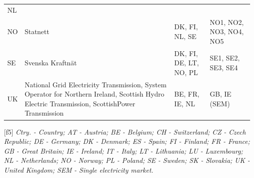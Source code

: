 \begin{longtable}[]{@{}llll@{}}
\begin{minipage}[t]{0.22\columnwidth}
NL\strut
\end{minipage}\tabularnewline
\begin{minipage}[t]{0.07\columnwidth}\raggedright
NO\strut
\end{minipage} & \begin{minipage}[t]{0.36\columnwidth}\raggedright
Statnett\strut
\end{minipage} & \begin{minipage}[t]{0.22\columnwidth}\raggedright
DK, FI, NL, SE\strut
\end{minipage} & \begin{minipage}[t]{0.22\columnwidth}\raggedright
NO1, NO2, NO3, NO4, NO5\strut
\end{minipage}\tabularnewline
\begin{minipage}[t]{0.07\columnwidth}\raggedright
SE\strut
\end{minipage} & \begin{minipage}[t]{0.36\columnwidth}\raggedright
Svenska Kraftnät\strut
\end{minipage} & \begin{minipage}[t]{0.22\columnwidth}\raggedright
DK, FI, DE, LT, NO, PL\strut
\end{minipage} & \begin{minipage}[t]{0.22\columnwidth}\raggedright
SE1, SE2, SE3, SE4\strut
\end{minipage}\tabularnewline
\begin{minipage}[t]{0.07\columnwidth}\raggedright
UK\strut
\end{minipage} & \begin{minipage}[t]{0.36\columnwidth}\raggedright
National Grid Electricity Transmission, System Operator for Northern
Ireland, Scottish Hydro Electric Transmission, ScottishPower
Transmission\strut
\end{minipage} & \begin{minipage}[t]{0.22\columnwidth}\raggedright
BE, FR, IE, NL\strut
\end{minipage} & \begin{minipage}[t]{0.22\columnwidth}\raggedright
GB, IE (SEM)\strut
\end{minipage}\tabularnewline
\bottomrule
\end{longtable}

\protect\hypertarget{f5}{}{{[}f5{]}} \emph{Ctry. - Country; AT -
Austria; BE - Belgium; CH - Switzerland; CZ - Czech Republic; DE -
Germany; DK - Denmark; ES - Spain; FI - Finland; FR - France; GB - Great
Britain; IE - Ireland; IT - Italy; LT - Lithuania; LU - Luxembourg; NL -
Netherlands; NO - Norway; PL - Poland; SE - Sweden; SK - Slovakia; UK -
United Kingdom; SEM - Single electricity market.}

